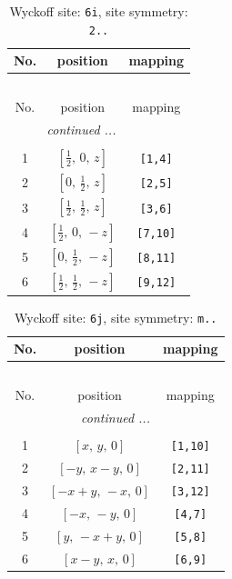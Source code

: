 \documentclass[fleqn,8pt]{jsarticle}
\begin{document}
\renewcommand{\arraystretch}{1.2}
\begin{longtable}{ccc}
\caption{Wyckoff site: {\tt 6i}, site symmetry: {\tt 2..}}
 \\
 \hline \hline
No. & position & mapping \\ \hline \endfirsthead

\multicolumn{2}{l}{\tablename\ \thetable{}} \\
 \hline \hline
No. & position & mapping \\ \hline \endhead

 \hline \hline
\multicolumn{2}{r}{\footnotesize\it continued ...} \\ \endfoot

 \hline \hline
\multicolumn{2}{r}{} \\ \endlastfoot

1 & $\left[ \frac{1}{2},\, 0,\, z \right]$ & {\tt [1,4]} \\ \hline
2 & $\left[ 0,\, \frac{1}{2},\, z \right]$ & {\tt [2,5]} \\ \hline
3 & $\left[ \frac{1}{2},\, \frac{1}{2},\, z \right]$ & {\tt [3,6]} \\ \hline
4 & $\left[ \frac{1}{2},\, 0,\, - z \right]$ & {\tt [7,10]} \\ \hline
5 & $\left[ 0,\, \frac{1}{2},\, - z \right]$ & {\tt [8,11]} \\ \hline
6 & $\left[ \frac{1}{2},\, \frac{1}{2},\, - z \right]$ & {\tt [9,12]} \\
\end{longtable}
\renewcommand{\arraystretch}{1.2}
\begin{longtable}{ccc}
\caption{Wyckoff site: {\tt 6j}, site symmetry: {\tt m..}}
 \\
 \hline \hline
No. & position & mapping \\ \hline \endfirsthead

\multicolumn{2}{l}{\tablename\ \thetable{}} \\
 \hline \hline
No. & position & mapping \\ \hline \endhead

 \hline \hline
\multicolumn{2}{r}{\footnotesize\it continued ...} \\ \endfoot

 \hline \hline
\multicolumn{2}{r}{} \\ \endlastfoot

1 & $\left[ x,\, y,\, 0 \right]$ & {\tt [1,10]} \\ \hline
2 & $\left[ - y,\, x - y,\, 0 \right]$ & {\tt [2,11]} \\ \hline
3 & $\left[ - x + y,\, - x,\, 0 \right]$ & {\tt [3,12]} \\ \hline
4 & $\left[ - x,\, - y,\, 0 \right]$ & {\tt [4,7]} \\ \hline
5 & $\left[ y,\, - x + y,\, 0 \right]$ & {\tt [5,8]} \\ \hline
6 & $\left[ x - y,\, x,\, 0 \right]$ & {\tt [6,9]} \\
\end{longtable}
\end{document}
